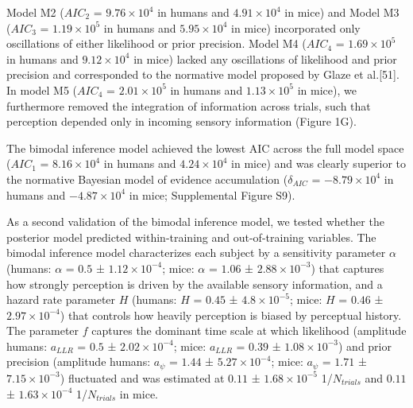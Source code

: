 \documentclass[
]{article}
\begin{document}
Model M2 (\(AIC_2\) = \(\ensuremath{9.76\times 10^{4}}\) in humans and
\(\ensuremath{4.91\times 10^{4}}\) in mice) and Model M3 (\(AIC_3\) =
\(\ensuremath{1.19\times 10^{5}}\) in humans and
\(\ensuremath{5.95\times 10^{4}}\) in mice) incorporated only
oscillations of either likelihood or prior precision. Model M4
(\(AIC_4\) = \(\ensuremath{1.69\times 10^{5}}\) in humans and
\(\ensuremath{9.12\times 10^{4}}\) in mice) lacked any oscillations of
likelihood and prior precision and corresponded to the normative model
proposed by Glaze et al.{[}51{]}. In model M5 (\(AIC_4\) =
\(\ensuremath{2.01\times 10^{5}}\) in humans and
\(\ensuremath{1.13\times 10^{5}}\) in mice), we furthermore removed the
integration of information across trials, such that perception depended
only in incoming sensory information (Figure 1G).

The bimodal inference model achieved the lowest AIC across the full
model space (\(AIC_1\) = \(\ensuremath{8.16\times 10^{4}}\) in humans
and \(\ensuremath{4.24\times 10^{4}}\) in mice) and was clearly superior
to the normative Bayesian model of evidence accumulation
(\(\delta_{AIC}\) = \(\ensuremath{-8.79\times 10^{4}}\) in humans and
\(\ensuremath{-4.87\times 10^{4}}\) in mice; Supplemental Figure S9).

As a second validation of the bimodal inference model, we tested whether
the posterior model predicted within-training and out-of-training
variables. The bimodal inference model characterizes each subject by a
sensitivity parameter \(\alpha\) (humans: \(\alpha\) = \(0.5\) ±
\(\ensuremath{1.12\times 10^{-4}}\); mice: \(\alpha\) = \(1.06\) ±
\(\ensuremath{2.88\times 10^{-3}}\)) that captures how strongly
perception is driven by the available sensory information, and a hazard
rate parameter \(H\) (humans: \(H\) = \(0.45\) ±
\(\ensuremath{4.8\times 10^{-5}}\); mice: \(H\) = \(0.46\) ±
\(\ensuremath{2.97\times 10^{-4}}\)) that controls how heavily
perception is biased by perceptual history. The parameter \(f\) captures
the dominant time scale at which likelihood (amplitude humans:
\(a_{LLR}\) = \(0.5\) ± \(\ensuremath{2.02\times 10^{-4}}\); mice:
\(a_{LLR}\) = \(0.39\) ± \(\ensuremath{1.08\times 10^{-3}}\)) and prior
precision (amplitude humans: \(a_{\psi}\) = \(1.44\) ±
\(\ensuremath{5.27\times 10^{-4}}\); mice: \(a_{\psi}\) = \(1.71\) ±
\(\ensuremath{7.15\times 10^{-3}}\)) fluctuated and was estimated at
\(0.11\) ± \(\ensuremath{1.68\times 10^{-5}}\) 1/\(N_{trials}\) and
\(0.11\) ± \(\ensuremath{1.63\times 10^{-4}}\) 1/\(N_{trials}\) in mice.
\end{document}
